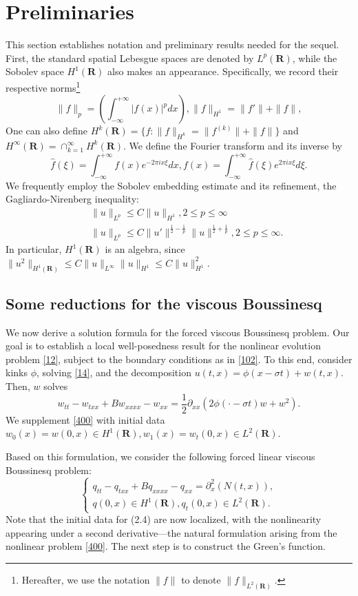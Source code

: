 \documentclass[12pt]{amsart}
\theoremstyle{definition}
\theoremstyle{remark}
\numberwithin{equation}{section}
\renewcommand{\(}{\left(}
\renewcommand{\)}{\right)}
\renewcommand{\[}{\left[}
\renewcommand{\]}{\right]}
\newcommand{\f}[2]{\frac{#1}{#2}}
\newcommand{\si}{\sigma}
\newcommand{\rone}{\mathbf R}
\newcommand{\p}{\partial}
\begin{document}
\section{Preliminaries} 
This section establishes notation and preliminary results needed for the sequel.  First, the standard spatial Lebesgue spaces are denoted by 
$L^p(\rone)$, while the Sobolev space $H^1(\rone)$ also makes an appearance. Specifically, we record their respective norms\footnote{ Hereafter, we use the notation $\|f\|$ to denote $\|f\|_{L^2(\rone)}$.} 
$$
 \|f\|_p=\left(\int_{-\infty}^{+\infty} |f(x)|^p dx\right), \|f\|_{H^1}=\|f'\|+\|f\|,
$$
One can also define $H^k(\rone)=\{ f: \|f\|_{H^k}=\|f^{(k)}\|+\|f\| \}$ and $H^\infty(\rone)=\cap_{k=1}^\infty H^k(\rone)$. 
We define the Fourier transform and its inverse by
$$
\hat{f}(\xi)=\int_{-\infty}^{+\infty} f(x) e^{-2\pi i x \xi} dx, f(x) =\int_{-\infty}^{+\infty} \hat{f}(\xi) e^{2\pi i x \xi} d\xi. 
$$
We frequently employ the Sobolev embedding estimate and its refinement, the Gagliardo-Nirenberg inequality: 
\begin{eqnarray}
	\label{gn:10} 
& & 	\|u\|_{L^p}\leq C \|u\|_{H^1}, 2\leq p\leq \infty \\
	\label{gn:15} 
	& & \|u\|_{L^p}\leq C \|u'\|^{\f{1}{2}-\f{1}{p}} \|u\|^{\f{1}{2}+\f{1}{p}},  2\leq p\leq \infty.
\end{eqnarray}
In particular, $H^1(\rone)$ is an algebra,  since $\|u^2\|_{H^1(\rone)}\leq C \|u\|_{L^\infty} \|u\|_{H^1}\leq C  \|u\|_{H^1}^2$.  
\subsection{Some reductions for the viscous Boussinesq}
We now derive a solution formula for the forced viscous Boussinesq problem. Our goal is to establish a local well-posedness result for the nonlinear evolution problem \eqref{12}, subject to the boundary conditions as in \eqref{102}. To this end, consider kinks $\phi$, solving  \eqref{14}, and the decomposition $u(t,x)=\phi(x-\si t)+w(t,x)$. Then, $w$ solves 
\begin{equation}
	\label{400} 
	w_{tt} - w_{txx}+ B w_{xxxx} - w_{xx}= \f{1}{2} \p_{xx} (2\phi(\cdot-\si t)w+w^2).
\end{equation}
We supplement \eqref{400} with initial data $w_0(x)=w(0,x)\in H^1(\rone), w_1(x) = w_t(0,x)\in L^2(\rone)$. 

Based on this formulation, we consider the following forced linear viscous Boussinesq problem: 
\begin{equation}
	\label{410} 
\left\{\begin{matrix}
		q_{tt} - q_{txx}+ B q_{xxxx} - q_{xx}=\p_x^2(N(t,x)), \\
		q(0,x) \in H^1(\rone),  q_t(0,x)\in L^2(\rone). 
	\end{matrix}
	\right. 
\end{equation}
Note that the initial data for (2.4) are now localized, with the nonlinearity appearing under a second derivative—the natural formulation arising from the nonlinear problem
 \eqref{400}. The next step is to construct the Green's function. 
\end{document}
